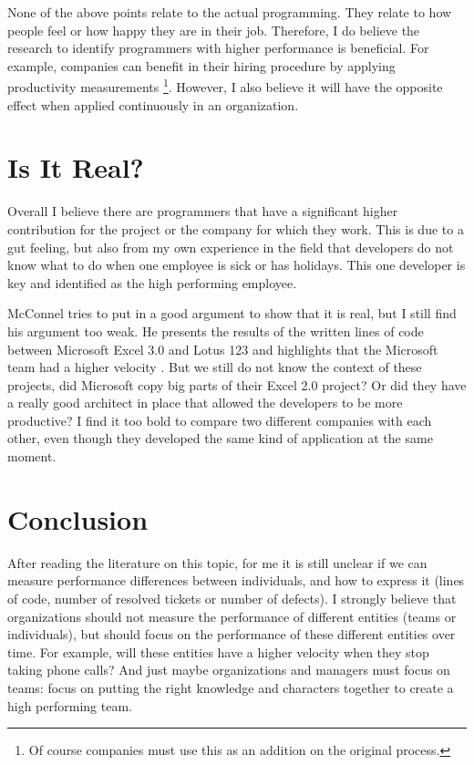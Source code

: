 None of the above points relate to the actual programming.
They relate to how people feel or how happy they are in their job.
Therefore, I do believe the research to identify programmers with higher performance is beneficial. For example, companies can benefit in their hiring procedure by applying productivity measurements
\footnote{Of course companies must use this as an addition on the original process.}.
However, I also believe it will have the opposite effect when applied continuously in an organization.

\section*{Is It Real?}

Overall I believe there are programmers that have a significant higher contribution for the project or the company for which they work.
This is due to a gut feeling, but also from my own experience in the field that developers do not know what to do when one employee is sick or has holidays.
This one developer is key and identified as the high performing employee.

McConnel tries to put in a good argument to show that it is real, but I still find his argument too weak.
He presents the results of the written lines of code between Microsoft Excel 3.0 and Lotus 123 and highlights that the Microsoft team had a higher velocity \autocite[572]{MAKING_SOFTWARE}.
But we still do not know the context of these projects, did Microsoft copy big parts of their Excel 2.0 project?
Or did they have a really good architect in place that allowed the developers to be more productive?
I find it too bold to compare two different companies with each other, even though they developed the same kind of application at the same moment.

\section*{Conclusion}

After reading the literature on this topic, for me it is still unclear if we can measure performance differences between individuals,
and how to express it (lines of code, number of resolved tickets or number of defects).
I strongly believe that organizations should not measure the performance of different entities (teams or individuals),
but should focus on the performance of these different entities over time.
For example, will these entities have a higher velocity when they stop taking phone calls?
And just maybe organizations and managers must focus on teams: focus on putting the right knowledge and characters together to create a high performing team.